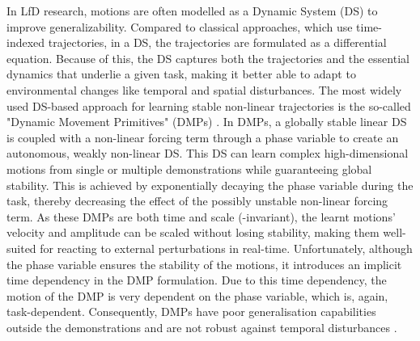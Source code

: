 In LfD research, motions are often modelled as a Dynamic System (DS) \cite{khansari-zadehLearningStableNonlinear2011} to improve generalizability. Compared to classical approaches, which use time-indexed trajectories, in a DS, the trajectories are formulated as a differential equation. Because of this, the DS captures both the trajectories and the essential dynamics that underlie a given task, making it better able to adapt to environmental changes like temporal and spatial disturbances. The most widely used DS-based approach for learning stable non-linear trajectories is the so-called "Dynamic Movement Primitives" (DMPs) \cite{ijspeertDynamicalMovementPrimitives2013,saverianoDynamicMovementPrimitives2021,wangLearningDemonstrationUsing2021,sidiropoulosReversibleDynamicMovement2021,ginesiOvercomingDrawbacksDynamic2021,rozanecNeuralDynamicMovement2022,liProDMPsUnifiedPerspective2022}. In DMPs, a globally stable linear DS is coupled with a non-linear forcing term through a phase variable to create an autonomous, weakly non-linear DS. This DS can learn complex high-dimensional motions from single \cite{ijspeertDynamicalMovementPrimitives2013,prakashDynamicTrajectoryGeneration2020} or multiple demonstrations \cite{matsubaraLearningParametricDynamic2011,pervezLearningTaskparameterizedDynamic2018} while guaranteeing global stability. This is achieved by exponentially decaying the phase variable during the task, thereby decreasing the effect of the possibly unstable non-linear forcing term. As these DMPs are both time and scale (-invariant), the learnt motions' velocity and amplitude can be scaled without losing stability, making them well-suited for reacting to external perturbations in real-time. Unfortunately, although the phase variable ensures the stability of the motions, it introduces an implicit time dependency in the DMP formulation. Due to this time dependency, the motion of the DMP is very dependent on the phase variable, which is, again, task-dependent. Consequently, DMPs have poor generalisation capabilities outside the demonstrations and are not robust against temporal disturbances \cite{neumannLearningRobotMotions2015}.



